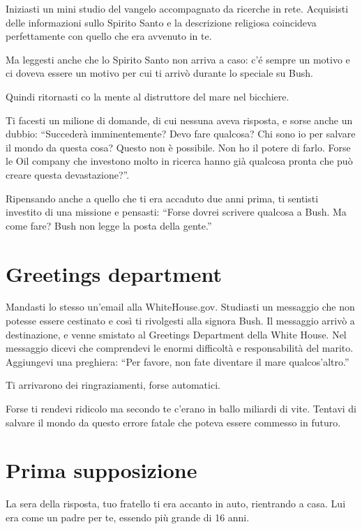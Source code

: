 Iniziasti un mini studio del vangelo accompagnato da ricerche in rete. Acquisisti delle informazioni sullo Spirito Santo e la descrizione religiosa coincideva perfettamente con quello che era avvenuto in te.

Ma leggesti anche che lo Spirito Santo non arriva a caso: c'é sempre un motivo e ci doveva essere un motivo per cui ti arrivò durante lo speciale su Bush.

Quindi ritornasti co la mente al distruttore del mare nel bicchiere.

Ti facesti un milione di domande, di cui nessuna aveva risposta, e sorse anche un dubbio: ``Succederà imminentemente? Devo fare qualcosa? Chi sono io per salvare il mondo da questa cosa? Questo non è possibile. Non ho il potere di farlo. Forse le Oil company che investono molto in ricerca hanno già qualcosa pronta che può creare questa devastazione?''.

Ripensando anche a quello che ti era accaduto due anni prima, ti sentisti investito di una missione e pensasti: ``Forse dovrei scrivere qualcosa a Bush. Ma come fare? Bush non legge la posta della gente.''

\section{Greetings department}
\label{greetings}

Mandasti lo stesso un'email alla WhiteHouse.gov. Studiasti un messaggio che non potesse essere cestinato e così ti rivolgesti alla signora Bush. Il messaggio arrivò a destinazione, e venne smistato al Greetings Department della White House. Nel messaggio dicevi che comprendevi le enormi difficoltà e responsabilità del marito. Aggiungevi una preghiera: “Per favore, non fate diventare il mare qualcos'altro.”

Ti arrivarono dei ringraziamenti, forse automatici.

Forse ti rendevi ridicolo ma secondo te c'erano in ballo miliardi di vite. Tentavi di salvare il mondo da questo errore fatale che poteva essere commesso in futuro.

\section{Prima supposizione}
\label{prima supposizione}

La sera della risposta, tuo fratello ti era accanto in auto, rientrando a casa. Lui era come un padre per te, essendo più grande di 16 anni.

